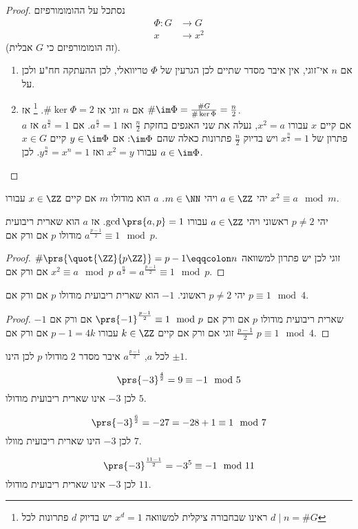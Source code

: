 \documentclass[a4paper,10pt,twoside,openany]{book}
\begin{document}
\begin{proof}
נסתכל על ההומומורפיזם
\begin{align*}
\Phi \colon G &\to G \\
x &\to x^2
\end{align*}
(זה הומומורפיזם כי
$G$
אבלית).
\begin{enumerate}
\item
אם
$n$
אי־זוגי, אין איבר מסדר שתיים לכן הגרעין של
$\Phi$
טריוואלי, לכן ההעתקה חח"ע ולכן על.

\item
אם
$n$
זוגי אז
$\# \ker \Phi = 2$.%
\footnote{ראינו שבחבורה ציקלית למשוואה
$x^d = 1$
יש בדיוק
$d$
פתרונות לכל
$d \mid n = \# G$}%
אז
$\# \im\Phi = \frac{\# G}{\# \ker \Phi} = \frac{n}{2}$.\\
אם קיים
$x$
עבורו
$x^2 = a$,
נעלה את שני האגפים בחזקת
$\frac{n}{2}$
ואז
$a^{\frac{n}{2}} = 1$.
אם
$a^{\frac{n}{2}} = 1$
אז
$a$
פתרון של
$x^{\frac{n}{2}} = 1$
ויש בדיוק
$\frac{n}{2}$
פתרונות כאלה שהם
$\im\Phi$:
אם
$y \in \im \Phi$
קיים
$x \in G$
עבורו
$x^2 = y$
ואז
$y^{\frac{n}{2}} = x^n = 1$.
לכן
$a \in \im\Phi$.
\end{enumerate}
\end{proof}
\begin{definition}
יהי
$a \in \ZZ$
ויהי
$m \in \NN$.
$a$
הוא
מודולו
$m$
אם קיים
$x \in \ZZ$
עבורו
$x^2 \equiv a \mod{m}$.
\end{definition}
\begin{corollary}
יהי
$p\neq 2$
ראשוני ויהי
$a \in \ZZ$
עבורו
$\gcd\prs{a,p} = 1$.
אז
$a$
הוא שארית ריבועית מודולו
$p$
אם ורק אם
$a^{\frac{p-1}{2}} \equiv 1 \mod{p}$.
\end{corollary}
\begin{proof}
$\# \prs{\quot{\ZZ}{p\ZZ}} = p-1 \eqqcolon n$
זוגי לכן יש פתרון למשוואה
$x^2 \equiv a \mod{p}$
אם ורק אם
$a^{\frac{n}{2}} = a^{\frac{p-1}{2}} \equiv 1 \mod{p}$.
\end{proof}

\begin{corollary}
יהי
$p \neq 2$
ראשוני.
$-1$
הוא שארית ריבועית מודולו
$p$
אם ורק אם
$p \equiv 1 \mod{4}$.
\end{corollary}
\begin{proof}
$-1$
שארית ריבועית מודולו
$p$
אם ורק אם
$\prs{-1}^{\frac{p-1}{2}} \equiv 1 \mod{p}$
אם ורק אם
$\frac{p-1}{2}$
זוגי אם ורק אם קיים
$k \in \ZZ$
עבורו
$p-1 = 4k$
אם ורק אם
$p \equiv 1 \mod{4}$.
\end{proof}
\begin{remark}
לכל
$a$,
$a^{\frac{p-1}{2}}$
איבר מסדר
$2$
מודולו
$p$
לכן הינו
$\pm 1$.
\end{remark}
\begin{example}
\[\prs{-3}^{\frac{4}{2}} = 9 \equiv -1\mod{5}\]
לכן
$-3$
אינו שארית ריבועית מודולו
$5$.
\end{example}
\begin{example}
\[\prs{-3}^{\frac{6}{2}} = -27 = -28+1 \equiv 1 \mod{7}\]
לכן
$-3$
הינו שארית ריבועית מוולו
$7$.
\end{example}
\begin{example}
\[\prs{-3}^{\frac{11-1}{2}} = -3^5 \equiv -1 \mod{11}\]
לכן
$-3$
אינו שארית ריבועית מודולו
$11$.
\end{example}
\end{document}
